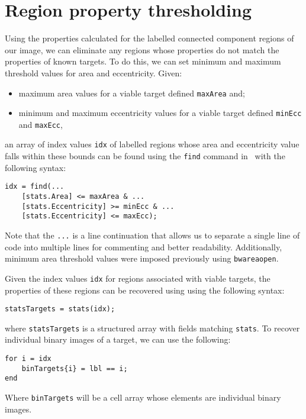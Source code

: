 \documentclass{tufte-handout}
\begin{document}
\section{Region property thresholding}
Using the properties calculated for the labelled connected component regions of our image, we can eliminate any regions whose properties do not match the properties of known targets. To do this, we can set minimum and maximum threshold values for area and eccentricity. Given:
\begin{itemize}
\item maximum area values for a viable target defined \lstinline{maxArea} and;
\item minimum and maximum eccentricity values for a viable target defined \lstinline{minEcc} and \lstinline{maxEcc},
\end{itemize}
an array of index values \lstinline{idx} of labelled regions whose area and eccentricity value falls within these bounds can be found using the \lstinline{find} command in \Matlab\ with the following syntax:
\begin{lstlisting}[style=usnaMatlab]
idx = find(...
	[stats.Area] <= maxArea & ... 
	[stats.Eccentricity] >= minEcc & ...
	[stats.Eccentricity] <= maxEcc);
\end{lstlisting}
Note that the \lstinline{...} is a line continuation that allows us to separate a single line of code into multiple lines for commenting and better readability. Additionally, minimum area threshold values were imposed previously using \lstinline{bwareaopen}.

Given the index values \lstinline{idx} for regions associated with viable targets, the properties of these regions can be recovered using using the following syntax:
\begin{lstlisting}[style=usnaMatlab]
statsTargets = stats(idx);
\end{lstlisting}
where \lstinline{statsTargets} is a structured array with fields matching \lstinline{stats}. To recover individual binary images of a target, we can use the following:
\begin{lstlisting}[style=usnaMatlab]
for i = idx
	binTargets{i} = lbl == i;
end
\end{lstlisting}
Where \lstinline{binTargets} will be a cell array whose elements are individual binary images.
\end{document}

